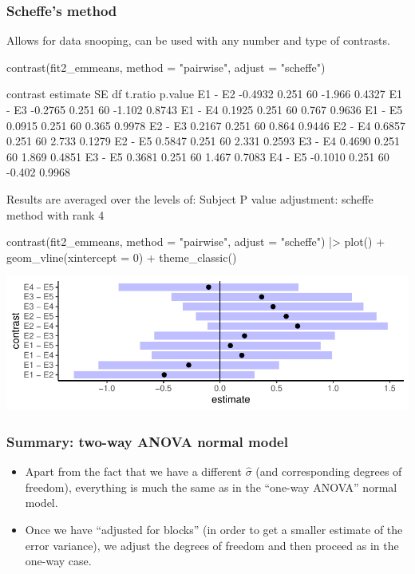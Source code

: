 \documentclass[a4paper]{article}\usepackage[]{graphicx}\usepackage[]{xcolor}
\makeatletter
\def\maxwidth{ %
  \ifdim\Gin@nat@width>\linewidth
    \linewidth
  \else
    \Gin@nat@width
  \fi
}
\makeatother
\begin{document}
\subsubsection{Scheffe's method}
Allows for data snooping, can be used with any number and type of contrasts.
\begin{Schunk}
\begin{Sinput}
contrast(fit2_emmeans, method = "pairwise", adjust = "scheffe")
\end{Sinput}
\begin{Soutput}
 contrast estimate    SE df t.ratio p.value
 E1 - E2   -0.4932 0.251 60  -1.966  0.4327
 E1 - E3   -0.2765 0.251 60  -1.102  0.8743
 E1 - E4    0.1925 0.251 60   0.767  0.9636
 E1 - E5    0.0915 0.251 60   0.365  0.9978
 E2 - E3    0.2167 0.251 60   0.864  0.9446
 E2 - E4    0.6857 0.251 60   2.733  0.1279
 E2 - E5    0.5847 0.251 60   2.331  0.2593
 E3 - E4    0.4690 0.251 60   1.869  0.4851
 E3 - E5    0.3681 0.251 60   1.467  0.7083
 E4 - E5   -0.1010 0.251 60  -0.402  0.9968

Results are averaged over the levels of: Subject 
P value adjustment: scheffe method with rank 4 
\end{Soutput}
\begin{Sinput}
contrast(fit2_emmeans, method = "pairwise", adjust = "scheffe") |> 
  plot() + geom_vline(xintercept = 0) +
  theme_classic()
\end{Sinput}


{\centering \includegraphics[width=\maxwidth]{figure/listings-unnamed-chunk-296-1} 

}

\end{Schunk}
\subsubsection{Summary: two-way ANOVA normal model}
\begin{itemize}
	\item Apart from the fact that we have a different \( \hat{\sigma} \) (and corresponding degrees of freedom), everything is much the same as in the ``one-way ANOVA'' normal model.
	\item Once we have ``adjusted for blocks'' (in order to get a smaller estimate of the error variance), we adjust the degrees of freedom and then proceed as in the one-way case.
\end{itemize}
\end{document}
